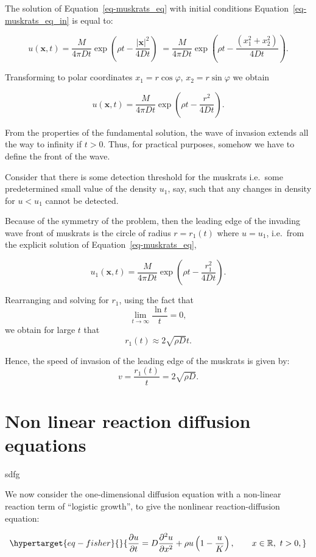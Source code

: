 \documentclass[
  letterpaper,
  DIV=11,
  numbers=noendperiod]{scrreprt}
\theoremstyle{plain}
\theoremstyle{definition}
\theoremstyle{plain}
\theoremstyle{remark}
\begin{document}
The solution of Equation~\ref{eq-muskrats_eq} with initial conditions
Equation~\ref{eq-muskrats_eq_in} is equal to:

\[
u({\mathbf{x}}, t) = \frac M{4 \pi D t} \exp \left(\rho t - \frac{ |{\mathbf{x}} |^2}{ 4Dt} \right)\; = \frac M{4 \pi D t} \exp \left(\rho t - \frac{ (x_{1}^{2} + x_{2}^{2})}{4Dt} \right).
\]

Transforming to polar coordinates \(x_1 = r \cos\varphi\),
\(x_2 = r \sin \varphi\) we obtain

\[
u({\mathbf{x}}, t) = \frac M{4 \pi D t} \exp \left(\rho t - \frac{ r^2}{ 4Dt} \right).
\]

From the properties of the fundamental solution, the wave of invasion
extends all the way to infinity if \(t>0\). Thus, for practical
purposes, somehow we have to define the front of the wave.

Consider that there is some detection threshold for the muskrats
i.e.~some predetermined small value of the density \(u_1\), say, such
that any changes in density for \(u <u_1\) cannot be detected.

Because of the symmetry of the problem, then the leading edge of the
invading wave front of muskrats is the circle of radius \(r=r_1(t)\)
where \(u=u_1\), i.e.~from the explicit solution of
Equation~\ref{eq-muskrats_eq},

\[
u_1({\mathbf{x}}, t) = \frac M{4 \pi D t} \exp \left(\rho t - \frac{ r_1^2}{ 4Dt} \right).
\]

Rearranging and solving for \(r_1\), using the fact that \[
\lim\limits_{t\to \infty} \dfrac {\ln t} t =0, 
\] we obtain for large \(t\) that \[
r_1(t) \approx 2 \sqrt{ \rho D} t.
\]

Hence, the speed of invasion of the leading edge of the muskrats is
given by: \[
v = \frac{r_1(t)}{t} =  2 \sqrt{ \rho D}. 
\]

\hypertarget{non-linear-reaction-diffusion-equations}{%
\chapter{Non linear reaction diffusion
equations}\label{non-linear-reaction-diffusion-equations}}

sdfg

We now consider the one-dimensional diffusion equation with a non-linear
reaction term of ``logistic growth'', to give the nonlinear
reaction-diffusion equation:

\begin{equation}\protect\hypertarget{eq-fisher}{}{
\frac{\partial u}{\partial t} = D\frac{\partial^2 u}{\partial x^2} +   \rho u\left(1-\frac u K\right), \qquad x\in \mathbb R, \, \, t >0,  
}\label{eq-fisher}\end{equation}
\end{document}

